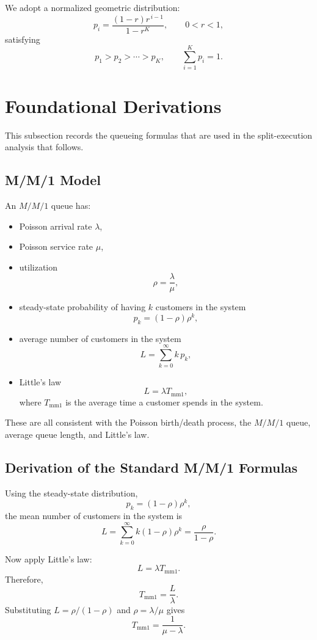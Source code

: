 \documentclass[12pt,a4paper]{article}
\begin{document}
We adopt a normalized geometric distribution:
\[
p_i = \frac{(1-r)r^{\,i-1}}{1-r^K}, \qquad 0<r<1,
\]
satisfying
\[
p_1 > p_2 > \cdots > p_K, \qquad \sum_{i=1}^K p_i = 1.
\]

\section{Foundational Derivations}

This subsection records the queueing formulas that are used in the split-execution analysis that follows.

\subsection{M/M/1 Model}

An $M/M/1$ queue has:
\begin{itemize}
    \item Poisson arrival rate $\lambda$,
    \item Poisson service rate $\mu$,
    \item utilization
    \[
    \rho = \frac{\lambda}{\mu},
    \]
    \item steady-state probability of having $k$ customers in the system
    \[
    p_k = (1-\rho)\rho^k,
    \]
    \item average number of customers in the system
    \[
    L = \sum_{k=0}^{\infty} k\,p_k,
    \]
    \item Little's law
    \[
    L = \lambda T_{\text{mm1}},
    \]
    where $T_{\text{mm1}}$ is the average time a customer spends in the system.
\end{itemize}
These are all consistent with the Poisson birth/death process, the $M/M/1$ queue, average queue length, and Little's law.

\subsection{Derivation of the Standard M/M/1 Formulas}

Using the steady-state distribution,
\[
p_k = (1-\rho)\rho^k,
\]
the mean number of customers in the system is
\[
L = \sum_{k=0}^{\infty} k(1-\rho)\rho^k
  = \frac{\rho}{1-\rho}.
\]

Now apply Little's law:
\[
L = \lambda T_{\text{mm1}}.
\]
Therefore,
\[
T_{\text{mm1}} = \frac{L}{\lambda}.
\]
Substituting $L = \rho/(1-\rho)$ and $\rho = \lambda/\mu$ gives
\[
T_{\text{mm1}} = \frac{1}{\mu-\lambda}.
\]
\end{document}
